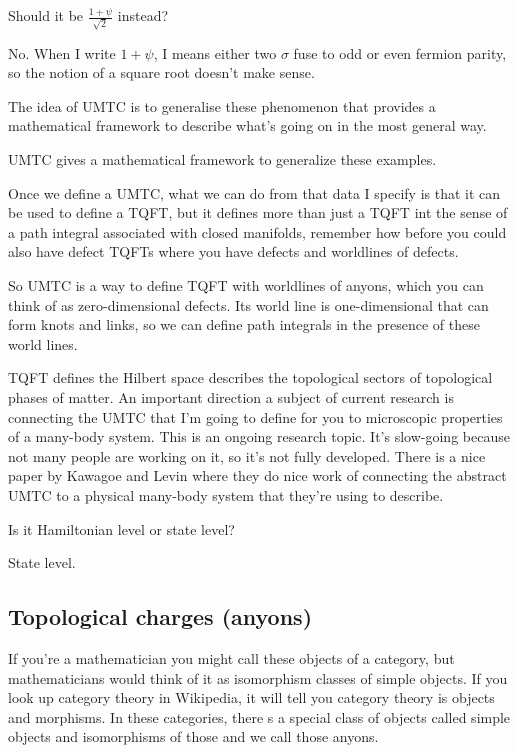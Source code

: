 \begin{question}
    Should it be $\frac{1+\psi}{\sqrt{2}}$ instead?
\end{question}
No. When I write $1+\psi$,
I means either two $\sigma$ fuse to odd or even fermion parity,
so the notion of a square root doesn't make sense.

The idea of UMTC is to generalise these phenomenon that provides a mathematical
framework to describe what's going on in the most general way.

UMTC gives a mathematical framework to generalize these examples.

Once we define a UMTC,
what we can do from that data I specify
is that it can be used to define a TQFT,
but it defines more than just a TQFT int the sense of a path integral associated
with closed manifolds,
remember how before you could also have defect TQFTs where you have defects and
worldlines of defects.

So UMTC is a way to define TQFT with worldlines of anyons,
which you can think of as zero-dimensional defects.
Its world line is one-dimensional that can form knots and links,
so we can define path integrals in the presence of these world lines.

TQFT defines the Hilbert space describes the topological sectors of topological
phases of matter.
An important direction a subject of current research is connecting the UMTC that
I'm going to define for you to microscopic properties of a many-body system.
This is an ongoing research topic.
It's slow-going because not many people are working on it,
so it's not fully developed.
There is a nice paper by Kawagoe and Levin where they do nice work of
connecting the abstract UMTC to a physical many-body system that they're using
to describe.

\begin{question}
    Is it Hamiltonian level or state level?
\end{question}
State level.


\subsection{Topological charges (anyons)}
If you're a mathematician you might call these objects of a category,
but mathematicians would think of it as isomorphism classes of simple objects.
If you look up category theory in Wikipedia,
it will tell you category theory is objects and morphisms.
In these categories,
there s a special class of objects called simple objects and isomorphisms of
those and we call those anyons.

